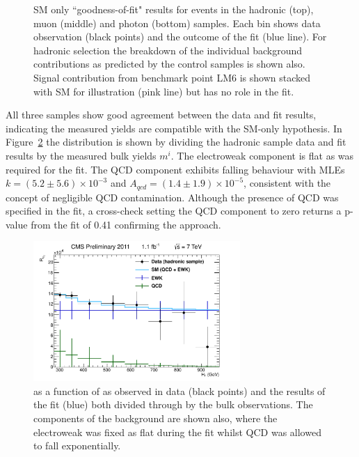 \begin{figure}[htbp]
\begin{center}
     \caption{\label{fig:fit} SM only ``goodness-of-fit" results for events in the hadronic (top), muon (middle) and photon (bottom) samples. Each \scalht bin shows data observation (black points) and the outcome of the fit (blue line). For hadronic selection the breakdown of the individual background contributions as predicted by the control samples is shown also. Signal contribution from benchmark point LM6 is shown stacked with SM for illustration (pink line) but has no role in the fit.}
   \end{center}
 \end{figure}
 
 All three samples show good agreement between the data and fit results, indicating the measured yields are compatible with the SM-only hypothesis. In Figure~\ref{fig:fitrat} the \RaT distribution is shown by dividing the hadronic sample data and fit results by the measured bulk yields $m^{i}$. The electroweak component is flat as was required for the fit. The QCD component exhibits falling behaviour with MLEs $k = (5.2 \pm 5.6) \times 10^{-3}$ and $A_{qcd} = (1.4 \pm 1.9) \times 10^{-5}$, consistent with the concept of negligible QCD contamination. Although the presence of QCD was specified in the fit, a cross-check setting the QCD component to zero returns a p-value from the fit of 0.41 confirming the approach. 
 
 \begin{figure}[htbp]
   \begin{center}
      \includegraphics[width = 0.70\textwidth]{Figures/Analysis/PAS/stats_plots/RQcdFallingExp/hadronic_signal_alphaT_ratio.pdf}
     \caption{\label{fig:fitrat} \RaT as a function of \scalht as observed in data (black points) and the results of the fit (blue) both divided through by the bulk observations. The components of the background are shown also, where the electroweak was fixed as flat during the fit whilst QCD was allowed to fall exponentially. }
   \end{center}
 \end{figure}
 
